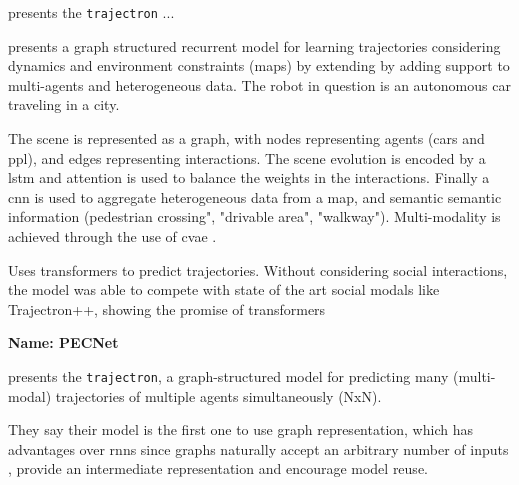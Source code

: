 
\cite{ivanovic2019trajectron} presents the \texttt{trajectron} ...


\cite{salzmann2020trajectron++}  presents a graph structured recurrent model for learning trajectories considering dynamics and environment constraints (maps) by extending \cite{ivanovic2019trajectron} by adding support to multi-agents and heterogeneous data. The robot in question is an autonomous car traveling in a city.

The scene is represented as a graph, with nodes representing agents (cars and ppl), and edges representing interactions.
%
The scene evolution is encoded by a \gls{lstm} and attention is used to balance the weights in the interactions.
%
Finally a \gls{cnn} is used to aggregate heterogeneous data from a map, and semantic semantic information (pedestrian crossing", "drivable area", "walkway"). 
%
Multi-modality is achieved through the use of \gls{cvae} .


\cite{giuliari2020transformer} Uses transformers to predict trajectories. Without considering social interactions, the model was able to compete with state of the art social modals like Trajectron++, showing the promise of transformers



\textbf{Name: PECNet}



\cite{ivanovic2019trajectron} presents the \texttt{trajectron}, a graph-structured model for predicting many (multi-modal) trajectories of multiple agents simultaneously (NxN).

They say their model is the first one to use graph representation, which has advantages over \glspl{rnn} since graphs naturally accept an arbitrary number of inputs , provide an intermediate representation and encourage model reuse.

